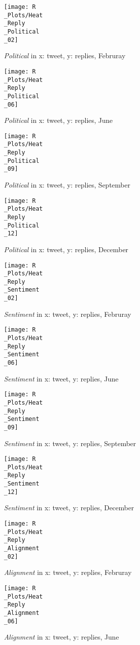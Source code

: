\documentclass[twoside,twocolumn]{article}
\begin{document}
	\begin{figure}[p]
		\texttt{[image: R\\\_Plots/Heat\\\_Reply\\\_Political\\\_02]}
		\caption{\textit{Political} in x: tweet, y: replies, Februray}\label{fig:R_Heat_Reply_Political_02}
	\end{figure}
	\begin{figure}
		\texttt{[image: R\\\_Plots/Heat\\\_Reply\\\_Political\\\_06]}
		\caption{\textit{Political} in x: tweet, y: replies, June}\label{fig:R_Heat_Reply_Political_06}
	\end{figure}
	\begin{figure}
		\texttt{[image: R\\\_Plots/Heat\\\_Reply\\\_Political\\\_09]}
		\caption{\textit{Political} in x: tweet, y: replies, September}\label{fig:R_Heat_Reply_Political_09}
	\end{figure}
	\begin{figure}
		\texttt{[image: R\\\_Plots/Heat\\\_Reply\\\_Political\\\_12]}
		\caption{\textit{Political} in x: tweet, y: replies, December}\label{fig:R_Heat_Reply_Political_12}
	\end{figure}
	\begin{figure}
		\texttt{[image: R\\\_Plots/Heat\\\_Reply\\\_Sentiment\\\_02]}
		\caption{\textit{Sentiment} in x: tweet, y: replies, Februray}\label{fig:R_Heat_Reply_Sentiment_02}
	\end{figure}
	\begin{figure}
		\texttt{[image: R\\\_Plots/Heat\\\_Reply\\\_Sentiment\\\_06]}
		\caption{\textit{Sentiment} in x: tweet, y: replies, June}\label{fig:R_Heat_Reply_Sentiment_06}
	\end{figure}
	\begin{figure}
		\texttt{[image: R\\\_Plots/Heat\\\_Reply\\\_Sentiment\\\_09]}
		\caption{\textit{Sentiment} in x: tweet, y: replies, September}\label{fig:R_Heat_Reply_Sentiment_09}
	\end{figure}
	\begin{figure}
		\texttt{[image: R\\\_Plots/Heat\\\_Reply\\\_Sentiment\\\_12]}
		\caption{\textit{Sentiment} in x: tweet, y: replies, December}\label{fig:R_Heat_Reply_Sentiment_12}
	\end{figure}
	\begin{figure}
		\texttt{[image: R\\\_Plots/Heat\\\_Reply\\\_Alignment\\\_02]}
		\caption{\textit{Alignment} in x: tweet, y: replies, Februray}\label{fig:R_Heat_Reply_Alignment_02}
	\end{figure}
	\begin{figure}
		\texttt{[image: R\\\_Plots/Heat\\\_Reply\\\_Alignment\\\_06]}
		\caption{\textit{Alignment} in x: tweet, y: replies, June}\label{fig:R_Heat_Reply_Alignment_06}
	\end{figure}
\end{document}
